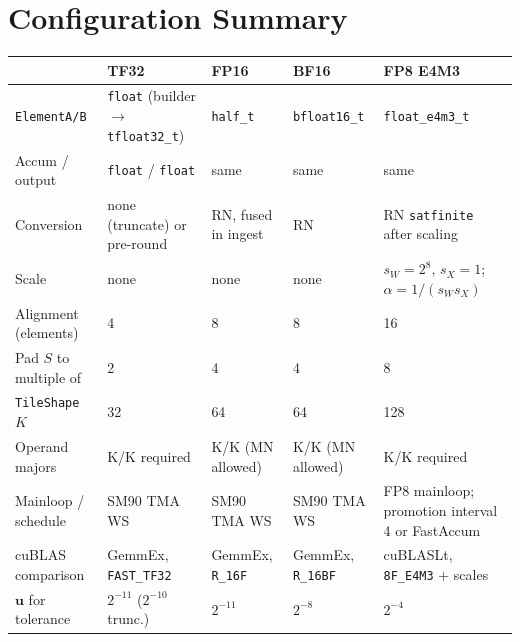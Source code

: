 \documentclass[10pt,letterpaper]{article}
\newcommand{\ur}{\mathbf{u}}
\begin{document}
\section{Configuration Summary}
\label{tab:config}

\begin{center}
\small
\begin{tabularx}{\linewidth}{@{}l X X X X@{}}
  \toprule
  & \textbf{TF32} & \textbf{FP16} & \textbf{BF16} & \textbf{FP8 E4M3} \\
  \midrule
  \texttt{ElementA/B} & \texttt{float} (builder $\to$ \texttt{tfloat32\_t}) & \texttt{half\_t} & \texttt{bfloat16\_t} & \texttt{float\_e4m3\_t} \\
  Accum / output & \texttt{float} / \texttt{float} & same & same & same \\
  Conversion & none (truncate) or pre-round & RN, fused in ingest & RN & RN \texttt{satfinite} after scaling \\
  Scale & none & none & none & $s_W = 2^8$, $s_X = 1$; $\alpha = 1/(s_W s_X)$ \\
  Alignment (elements) & 4 & 8 & 8 & 16 \\
  Pad $S$ to multiple of & 2 & 4 & 4 & 8 \\
  \texttt{TileShape} $K$ & 32 & 64 & 64 & 128 \\
  Operand majors & K/K required & K/K (MN allowed) & K/K (MN allowed) & K/K required \\
  Mainloop / schedule & SM90 TMA WS & SM90 TMA WS & SM90 TMA WS & FP8 mainloop; promotion interval 4 or FastAccum \\
  cuBLAS comparison & GemmEx, \texttt{FAST\_TF32} & GemmEx, \texttt{R\_16F} & GemmEx, \texttt{R\_16BF} & cuBLASLt, \texttt{8F\_E4M3} + scales \\
  $\ur$ for tolerance & $2^{-11}$ ($2^{-10}$ trunc.) & $2^{-11}$ & $2^{-8}$ & $2^{-4}$ \\
  \bottomrule
\end{tabularx}
\end{center}
\end{document}
